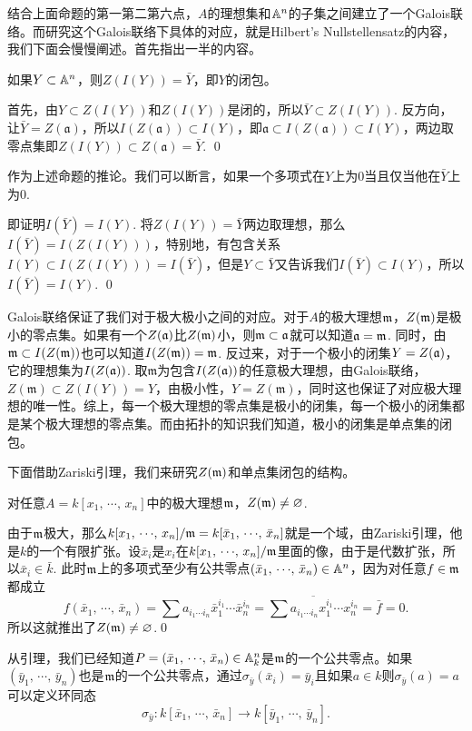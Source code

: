 结合上面命题的第一第二第六点，$A$的理想集和$\mathbb{A}^n$的子集之间建立了一个Galois联络。而研究这个Galois联络下具体的对应，就是Hilbert's Nullstellensatz的内容，我们下面会慢慢阐述。首先指出一半的内容。

\pro 如果$Y \subset \mathbb{A}^n$，则$Z(I(Y))=\bar{Y}$，即$Y$的闭包。

\proof 首先，由$Y\subset Z(I(Y))$和$Z(I(Y))$是闭的，所以$\bar{Y}\subset Z(I(Y))$. 反方向，让$\bar{Y}=Z(\mathfrak{a})$，所以$I(Z(\mathfrak{a}))\subset I(Y)$，即$\mathfrak{a}\subset I(Z(\mathfrak{a}))\subset I(Y)$，两边取零点集即$Z(I(Y))\subset Z(\mathfrak{a})=\bar{Y}$. \qed

作为上述命题的推论。我们可以断言，如果一个多项式在$Y$上为$0$当且仅当他在$\bar{Y}$上为$0$. 

\proof 即证明$I(\bar{Y})=I(Y)$. 将$Z(I(Y))=\bar{Y}$两边取理想，那么$I(\bar{Y})=I(Z(I(Y)))$，特别地，有包含关系$I(Y)\subset I(Z(I(Y)))=I(\bar{Y})$，但是$Y\subset \bar{Y}$又告诉我们$I(\bar{Y})\subset I(Y)$，所以$I(\bar{Y})=I(Y)$. \qed

\para Galois联络保证了我们对于极大极小之间的对应。对于$A$的极大理想$\mathfrak{m}$，$Z(\mathfrak{m})$是极小的零点集。如果有一个$Z(\mathfrak{a})$比$Z(\mathfrak{m})$小，则$\mathfrak{m}\subset \mathfrak{a}$就可以知道$\mathfrak{a}=\mathfrak{m}$. 同时，由$\mathfrak{m} \subset I(Z(\mathfrak{m}))$也可以知道$I(Z(\mathfrak{m}))=\mathfrak{m}$. 反过来，对于一个极小的闭集$Y=Z(\mathfrak{a})$，它的理想集为$I(Z(\mathfrak{a}))$. 取$\mathfrak{m}$为包含$I(Z(\mathfrak{a}))$的任意极大理想，由Galois联络，$Z(\mathfrak{m})\subset Z(I(Y))=Y$，由极小性，$Y=Z(\mathfrak{m})$，同时这也保证了对应极大理想的唯一性。综上，每一个极大理想的零点集是极小的闭集，每一个极小的闭集都是某个极大理想的零点集。而由拓扑的知识我们知道，极小的闭集是单点集的闭包。

下面借助Zariski引理，我们来研究$Z(\mathfrak{m})$和单点集闭包的结构。

\lem 对任意$A=k[x_1,\,\cdots\!,\,x_n]$中的极大理想$\mathfrak{m}$，$Z(\mathfrak{m})\neq\varnothing$.

\proof 由于$\mathfrak{m}$极大，那么$k[x_1,\,\cdots\!,\,x_n]/\mathfrak{m}=k[\bar{x}_1,\,\cdots\!,\,\bar{x}_n]$就是一个域，由Zariski引理，他是$k$的一个有限扩张。设$\bar{x}_i$是$x_i$在$k[x_1,\,\cdots\!,\,x_n]/\mathfrak{m}$里面的像，由于是代数扩张，所以$\bar{x}_i\in \bar{k}$. 此时$\mathfrak{m}$上的多项式至少有公共零点$(\bar{x}_1,\,\cdots\!,\,\bar{x}_n)\in \mathbb{A}^n$，因为对任意$f\in \mathfrak{m}$都成立
\[
	f(\bar{x}_1,\,\cdots\!,\,\bar{x}_n)=\sum a_{i_1\cdots i_n} {\bar{x}}_1^{i_1}\cdots {\bar{x}}_n^{i_n}=\overline{\sum a_{i_1\cdots i_n} x_1^{i_1}\cdots x_n^{i_n}}=\bar{f}=0.
\]
所以这就推出了$Z(\mathfrak{m})\neq\varnothing$.\qed 

从引理，我们已经知道$P=(\bar{x}_1,\,\cdots\!,\,\bar{x}_n)\in \mathbb{A}^n_k$是$\mathfrak{m}$的一个公共零点。如果$(\bar{y}_1,\,\cdots\!,\,\bar{y}_n)$也是$\mathfrak{m}$的一个公共零点，通过$\sigma_{\bar{y}}(\bar{x}_i)=\bar{y}_i$且如果$a\in k$则$\sigma_{\bar{y}}(a)=a$可以定义环同态
\[
	\sigma_{\bar{y}}:k[\bar{x}_1,\,\cdots\!,\,\bar{x}_n]\to k[\bar{y}_1,\,\cdots\!,\,\bar{y}_n].
\]

